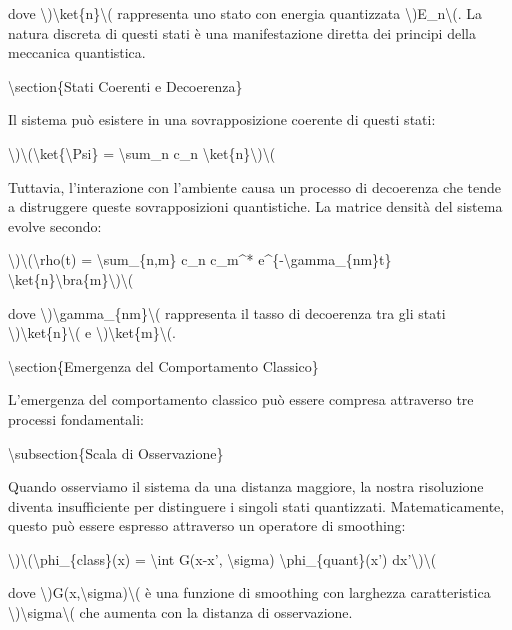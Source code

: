 \documentclass[a4paper,11pt]{article}
\begin{document}
dove \textbackslash{})\textbackslash{}ket\{n\}\textbackslash{}( rappresenta uno stato con energia quantizzata \textbackslash{})E\_n\textbackslash{}(. La
natura discreta di questi stati \`e una manifestazione diretta dei
principi della meccanica quantistica.

\textbackslash{}section\{Stati Coerenti e Decoerenza\}

Il sistema pu\`o esistere in una sovrapposizione coerente di questi stati:

\textbackslash{})\textbackslash{}(\textbackslash{}ket\{\textbackslash{}Psi\} = \textbackslash{}sum\_n c\_n \textbackslash{}ket\{n\}\textbackslash{})\textbackslash{}(

Tuttavia, l'interazione con l'ambiente causa un processo di decoerenza
che tende a distruggere queste sovrapposizioni quantistiche. La matrice
densit\`a del sistema evolve secondo:

\textbackslash{})\textbackslash{}(\textbackslash{}rho(t) = \textbackslash{}sum\_\{n,m\} c\_n c\_m\textasciicircum{}* e\textasciicircum{}\{-\textbackslash{}gamma\_\{nm\}t\} \textbackslash{}ket\{n\}\textbackslash{}bra\{m\}\textbackslash{})\textbackslash{}(

dove \textbackslash{})\textbackslash{}gamma\_\{nm\}\textbackslash{}( rappresenta il tasso di decoerenza tra gli stati
\textbackslash{})\textbackslash{}ket\{n\}\textbackslash{}( e \textbackslash{})\textbackslash{}ket\{m\}\textbackslash{}(.

\textbackslash{}section\{Emergenza del Comportamento Classico\}

L'emergenza del comportamento classico pu\`o essere compresa attraverso
tre processi fondamentali:

\textbackslash{}subsection\{Scala di Osservazione\}

Quando osserviamo il sistema da una distanza maggiore, la nostra
risoluzione diventa insufficiente per distinguere i singoli stati
quantizzati. Matematicamente, questo pu\`o essere espresso attraverso un
operatore di smoothing:

\textbackslash{})\textbackslash{}(\textbackslash{}phi\_\{class\}(x) = \textbackslash{}int G(x-x', \textbackslash{}sigma) \textbackslash{}phi\_\{quant\}(x') dx'\textbackslash{})\textbackslash{}(

dove \textbackslash{})G(x,\textbackslash{}sigma)\textbackslash{}( \`e una funzione di smoothing con larghezza
caratteristica \textbackslash{})\textbackslash{}sigma\textbackslash{}( che aumenta con la distanza di osservazione.
\end{document}
